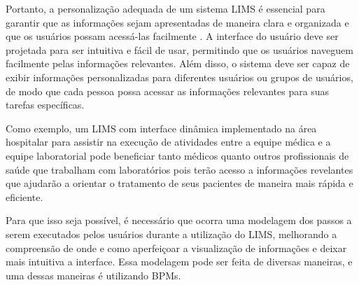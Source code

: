 Portanto, a personalização adequada de um sistema LIMS é essencial para garantir que as informações sejam apresentadas de maneira clara e organizada e que os usuários possam acessá-las facilmente \R. A interface do usuário deve ser projetada para ser intuitiva e fácil de usar, permitindo que os usuários naveguem facilmente pelas informações relevantes. Além disso, o sistema deve ser capaz de exibir informações personalizadas para diferentes usuários ou grupos de usuários, de modo que cada pessoa possa acessar as informações relevantes para suas tarefas específicas.


Como exemplo, um LIMS com interface dinâmica implementado na área hospitalar para assistir na execução de atividades entre a equipe médica e a equipe laboratorial pode beneficiar tanto médicos quanto outros profissionais de saúde que trabalham com laboratórios pois terão acesso a informações revelantes que ajudarão a orientar o tratamento de seus pacientes de maneira mais rápida e eficiente.

Para que isso seja possível, é necessário que ocorra uma modelagem dos passos a serem executados pelos usuários durante a utilização do LIMS, melhorando a compreensão de onde e como aperfeiçoar a visualização de informações e deixar mais intuitiva a interface. Essa modelagem pode ser feita de diversas maneiras, e uma dessas maneiras é utilizando BPMs.
